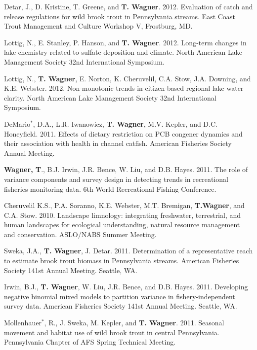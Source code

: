 \documentclass[10pt]{article}
\begin{document}
\begin{flushleft}
\begin{etaremune}
\item Detar, J., D. Kristine, T. Greene, and {\bf T. Wagner}. 2012. Evaluation of catch and release regulations for wild brook trout in Pennsylvania streams. East Coast Trout Management and Culture Workshop V, Frostburg, MD.

\item Lottig, N., E. Stanley, P. Hanson, and {\bf T. Wagner}. 2012. Long-term changes in lake chemistry related to sulfate deposition and climate. North American Lake Management Society 32nd International Symposium.

\item Lottig, N., {\bf T. Wagner}, E. Norton, K. Cheruvelil, C.A. Stow, J.A. Downing, and K.E. Webster. 2012. Non-monotonic trends in citizen-based regional lake water clarity. North American Lake Management Society 32nd International Symposium.


\item DeMario$^*$, D.A., L.R. Iwanowicz, {\bf T. Wagner}, M.V. Kepler, and D.C. Honeyfield. 2011. Effects of dietary restriction on PCB congener dynamics and their association with health in channel catfish. American Fisheries Society Annual Meeting. 

\item {\bf Wagner, T}., B.J. Irwin, J.R. Bence, W. Liu, and D.B. Hayes. 2011. The role of variance components and survey design in detecting trends in recreational fisheries monitoring data. 6th World Recreational Fishing Conference. 

\item Cheruvelil K.S., P.A. Soranno, K.E. Webster, M.T. Bremigan, {\bf T.Wagner}, and C.A. Stow. 2010. Landscape limnology: integrating freshwater, terrestrial, and human landscapes for ecological understanding, natural resource management and conservation. ASLO/NABS Summer Meeting.

\item Sweka, J.A., {\bf T. Wagner}, J. Detar. 2011. Determination of a representative reach to estimate brook trout biomass in Pennsylvania streams. American Fisheries Society 141st Annual Meeting. Seattle, WA.

\item Irwin, B.J., {\bf T. Wagner}, W. Liu, J.R. Bence, and D.B. Hayes. 2011. Developing negative binomial mixed models to partition variance in fishery-independent survey data. American Fisheries Society 141st Annual Meeting. Seattle, WA.

\item Mollenhauer$^*$, R., J. Sweka, M. Kepler, and  {\bf T. Wagner}. 2011. Seasonal movement and habitat use of wild brook trout in central Pennsylvania. Pennsylvania Chapter of AFS Spring Technical Meeting.


\end{etaremune}
\end{flushleft}
\end{document}

